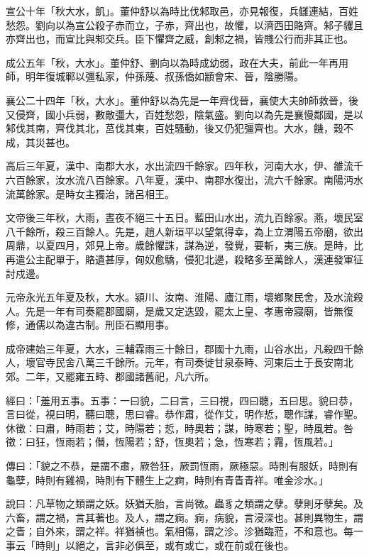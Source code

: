 \begin{pinyinscope}
宣公十年「秋大水，飢」。董仲舒以為時比伐邾取邑，亦見報復，兵讎連結，百姓愁怨。劉向以為宣公殺子赤而立，子赤，齊出也，故懼，以濟西田賂齊。邾子貜且亦齊出也，而宣比與邾交兵。臣下懼齊之威，創邾之禍，皆賤公行而非其正也。

成公五年「秋，大水」。董仲舒、劉向以為時成幼弱，政在大夫，前此一年再用師，明年復城鄆以彊私家，仲孫蔑、叔孫僑如顓會宋、晉，陰勝陽。

襄公二十四年「秋，大水」。董仲舒以為先是一年齊伐晉，襄使大夫帥師救晉，後又侵齊，國小兵弱，數敵彊大，百姓愁怨，陰氣盛。劉向以為先是襄慢鄰國，是以邾伐其南，齊伐其北，莒伐其東，百姓騷動，後又仍犯彊齊也。大水，饑，穀不成，其災甚也。

高后三年夏，漢中、南郡大水，水出流四千餘家。四年秋，河南大水，伊、雒流千六百餘家，汝水流八百餘家。八年夏，漢中、南郡水復出，流六千餘家。南陽沔水流萬餘家。是時女主獨治，諸呂相王。

文帝後三年秋，大雨，晝夜不絕三十五日。藍田山水出，流九百餘家。燕，壞民室八千餘所，殺三百餘人。先是，趙人新垣平以望氣得幸，為上立渭陽五帝廟，欲出周鼎，以夏四月，郊見上帝。歲餘懼誅，謀為逆，發覺，要斬，夷三族。是時，比再遣公主配單于，賂遺甚厚，匈奴愈驕，侵犯北邊，殺略多至萬餘人，漢連發軍征討戍邊。

元帝永光五年夏及秋，大水。潁川、汝南、淮陽、廬江雨，壞鄉聚民舍，及水流殺人。先是一年有司奏罷郡國廟，是歲又定迭毀，罷太上皇、孝惠帝寢廟，皆無復修，通儒以為違古制。刑臣石顯用事。

成帝建始三年夏，大水，三輔霖雨三十餘日，郡國十九雨，山谷水出，凡殺四千餘人，壞官寺民舍八萬三千餘所。元年，有司奏徙甘泉泰畤、河東后土于長安南北郊。二年，又罷雍五畤、郡國諸舊祀，凡六所。

經曰：「羞用五事。五事：一曰貌，二曰言，三曰視，四曰聽，五曰思。貌曰恭，言曰從，視曰明，聽曰聰，思曰睿。恭作肅，從作艾，明作悊，聰作謀，睿作聖。休徵：曰肅，時雨若；艾，時陽若；悊，時奧若；謀，時寒若；聖，時風若。咎徵：曰狂，恆雨若；僭，恆陽若；舒，恆奧若；急，恆寒若；霿，恆風若。」

傳曰：「貌之不恭，是謂不肅，厥咎狂，厥罰恆雨，厥極惡。時則有服妖，時則有龜孽，時則有雞禍，時則有下體生上之痾，時則有青眚青祥。唯金沴水。」

說曰：凡草物之類謂之妖。妖猶夭胎，言尚微。蟲豸之類謂之孽。孽則牙孽矣。及六畜，謂之禍，言其著也。及人，謂之痾。痾，病貌，言浸深也。甚則異物生，謂之眚；自外來，謂之祥。祥猶禎也。氣相傷，謂之沴。沴猶臨蒞，不和意也。每一事云「時則」以絕之，言非必俱至，或有或亡，或在前或在後也。


\end{pinyinscope}
